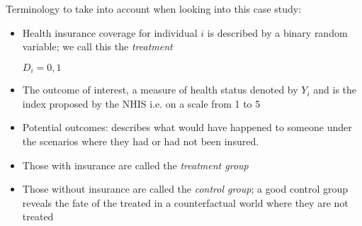\documentclass[12pt, letterpaper]{article}
\begin{document}
{\vspace{10pt}
\noindent Terminology to take into account when looking into this case study:
\begin{itemize}
	\item Health insurance coverage for individual $i$ is described by a binary random variable; we call this the \textit{treatment}
	\begin{center}
	$D_i = {0,1}$
	\end{center}
	\item The outcome of interest, a measure of health status denoted by $Y_i$ and is the index proposed by the NHIS i.e. on a scale from 1 to 5
	\item Potential outcomes: describes what would have happened to someone under the scenarios where they had or had not been insured. 
	\item Those with insurance are called the \textit{treatment group}
	\item Those without insurance are called the \textit{control group}; a good control group reveals the fate of the treated in a counterfactual world where they are not treated
\end{itemize}

}
\end{document}
